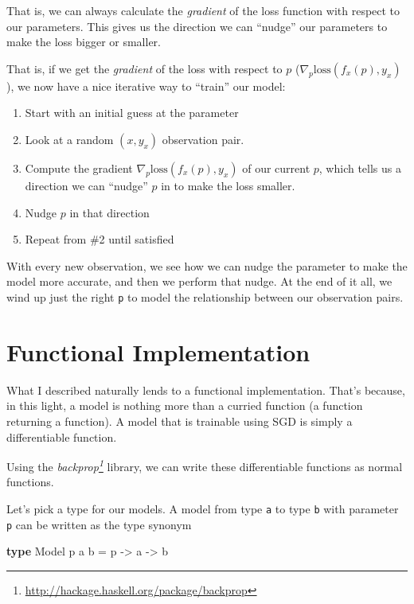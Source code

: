\documentclass[]{article}
\newenvironment{Shaded}{}{}
\newcommand{\DataTypeTok}[1]{\textcolor[rgb]{0.56,0.13,0.00}{#1}}
\newcommand{\KeywordTok}[1]{\textcolor[rgb]{0.00,0.44,0.13}{\textbf{#1}}}
\newcommand{\NormalTok}[1]{#1}
\newcommand{\OtherTok}[1]{\textcolor[rgb]{0.00,0.44,0.13}{#1}}
\renewcommand{\href}[2]{#2\footnote{\url{#1}}}
\begin{document}
That is, we can always calculate the \emph{gradient} of the loss function with
respect to our parameters. This gives us the direction we can ``nudge'' our
parameters to make the loss bigger or smaller.

That is, if we get the \emph{gradient} of the loss with respect to \(p\)
(\(\nabla_p \text{loss}(f_x(p), y_x)\)), we now have a nice iterative way to
``train'' our model:

\begin{enumerate}
\def\labelenumi{\arabic{enumi}.}
\tightlist
\item
  Start with an initial guess at the parameter
\item
  Look at a random \((x, y_x)\) observation pair.
\item
  Compute the gradient \(\nabla_p \text{loss}(f_x(p), y_x)\) of our current
  \(p\), which tells us a direction we can ``nudge'' \(p\) in to make the loss
  smaller.
\item
  Nudge \(p\) in that direction
\item
  Repeat from \#2 until satisfied
\end{enumerate}

With every new observation, we see how we can nudge the parameter to make the
model more accurate, and then we perform that nudge. At the end of it all, we
wind up just the right \texttt{p} to model the relationship between our
observation pairs.

\hypertarget{functional-implementation}{%
\section{Functional Implementation}\label{functional-implementation}}

What I described naturally lends to a functional implementation. That's because,
in this light, a model is nothing more than a curried function (a function
returning a function). A model that is trainable using SGD is simply a
differentiable function.

Using the \emph{\href{http://hackage.haskell.org/package/backprop}{backprop}}
library, we can write these differentiable functions as normal functions.

Let's pick a type for our models. A model from type \texttt{a} to type
\texttt{b} with parameter \texttt{p} can be written as the type synonym

\begin{Shaded}
\begin{Highlighting}[]
\KeywordTok{type} \DataTypeTok{Model}\NormalTok{ p a b }\OtherTok{=}\NormalTok{ p }\OtherTok{{-}>}\NormalTok{ a }\OtherTok{{-}>}\NormalTok{ b}
\end{Highlighting}
\end{Shaded}
\end{document}
